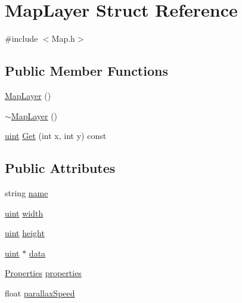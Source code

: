 \hypertarget{struct_map_layer}{}\section{Map\+Layer Struct Reference}
\label{struct_map_layer}


{\ttfamily \#include $<$Map.\+h$>$}

\subsection*{Public Member Functions}
\begin{DoxyCompactItemize}
\item 
\mbox{\hyperlink{struct_map_layer_ac2dab51bb0671c762fc9e4b8531f4931}{Map\+Layer}} ()
\item 
\mbox{\hyperlink{struct_map_layer_a94609aba07cd4a3afb940d6256e3f366}{$\sim$\+Map\+Layer}} ()
\item 
\mbox{\hyperlink{_defs_8h_a91ad9478d81a7aaf2593e8d9c3d06a14}{uint}} \mbox{\hyperlink{struct_map_layer_ad4752612f0af4b42b1fdca9f3a1fda91}{Get}} (int x, int y) const
\end{DoxyCompactItemize}
\subsection*{Public Attributes}
\begin{DoxyCompactItemize}
\item 
string \mbox{\hyperlink{struct_map_layer_a55f668f0cd0b57882a81d14bdd518fe8}{name}}
\item 
\mbox{\hyperlink{_defs_8h_a91ad9478d81a7aaf2593e8d9c3d06a14}{uint}} \mbox{\hyperlink{struct_map_layer_a61b0c86af821d15041977da477280a75}{width}}
\item 
\mbox{\hyperlink{_defs_8h_a91ad9478d81a7aaf2593e8d9c3d06a14}{uint}} \mbox{\hyperlink{struct_map_layer_a9f17d91932974bb7c0e9379820ed3c4e}{height}}
\item 
\mbox{\hyperlink{_defs_8h_a91ad9478d81a7aaf2593e8d9c3d06a14}{uint}} $\ast$ \mbox{\hyperlink{struct_map_layer_a31785455fa036f861d0c31c5cce8fdf1}{data}}
\item 
\mbox{\hyperlink{struct_properties}{Properties}} \mbox{\hyperlink{struct_map_layer_a5c10b6ba536dcdb7d72be9cb12927e41}{properties}}
\item 
float \mbox{\hyperlink{struct_map_layer_a228cea01dc3f3a9f185085c3a06c7157}{parallax\+Speed}}
\end{DoxyCompactItemize}


